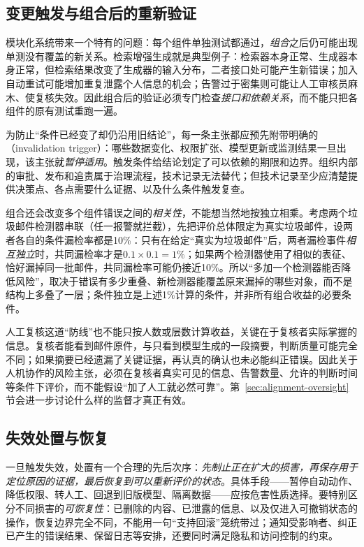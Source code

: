 \subsection{变更触发与组合后的重新验证}

模块化系统带来一个特有的问题：每个组件单独测试都通过，\emph{组合}之后仍可能出现单测没有覆盖的新关系。检索增强生成就是典型例子：检索器本身正常、生成器本身正常，但检索结果改变了生成器的输入分布，二者接口处可能产生新错误；加入自动重试可能增加重复泄露个人信息的机会；告警过于密集则可能让人工审核员麻木、使复核失效。因此组合后的验证必须专门检查\emph{接口和依赖关系}，而不能只把各组件的原有测试重跑一遍。

为防止“条件已经变了却仍沿用旧结论”，每一条主张都应预先附带明确的（invalidation trigger）：哪些数据变化、权限扩张、模型更新或监测结果一旦出现，该主张就\emph{暂停适用}。触发条件给结论划定了可以依赖的期限和边界。组织内部的审批、发布和追责属于治理流程，技术记录无法替代；但技术记录至少应清楚提供决策点、各点需要什么证据、以及什么条件触发复查。

组合还会改变多个组件错误之间的\emph{相关性}，不能想当然地按独立相乘。考虑两个垃圾邮件检测器串联（任一报警就拦截），先把评价总体限定为真实垃圾邮件，设两者各自的条件漏检率都是10\%：只有在给定“真实为垃圾邮件”后，两者漏检事件\emph{相互独立}时，共同漏检率才是$0.1\times0.1=1\%$；如果两个检测器使用了相似的表征、恰好漏掉同一批邮件，共同漏检率可能仍接近10\%。所以“多加一个检测器能否降低风险”，取决于错误有多少重叠、新检测器能覆盖原来漏掉的哪些对象，而不是结构上多叠了一层；条件独立是上述1\%计算的条件，并非所有组合收益的必要条件。

人工复核这道“防线”也不能只按人数或层数计算收益，关键在于复核者实际掌握的信息。复核者能看到邮件原件，与只看到模型生成的一段摘要，判断质量可能完全不同；如果摘要已经遗漏了关键证据，再认真的确认也未必能纠正错误。因此关于人机协作的风险主张，必须在复核者真实可见的信息、告警数量、允许的判断时间等条件下评价，而不能假设“加了人工就必然可靠”。第~\ref{sec:alignment-oversight}节会进一步讨论什么样的监督才真正有效。

\subsection{失效处置与恢复}

一旦触发失效，处置有一个合理的先后次序：\emph{先制止正在扩大的损害，再保存用于定位原因的证据，最后恢复到可以重新评价的状态}。具体手段——暂停自动动作、降低权限、转人工、回退到旧版模型、隔离数据——应按危害性质选择。要特别区分不同损害的\emph{可恢复性}：已删除的内容、已泄露的信息、以及仅进入可撤销状态的操作，恢复边界完全不同，不能用一句“支持回滚”笼统带过；通知受影响者、纠正已产生的错误结果、保留日志等安排，还要同时满足隐私和访问控制的约束。

